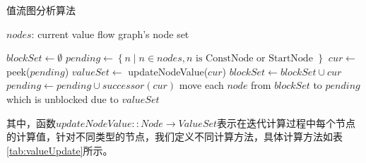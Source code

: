 \begin{algorithm}
[H]
	\caption{值流图分析算法}
	\label{alg:值流图分析算法}
	\begin{algorithmic}[1]
		
		\REQUIRE $nodes$: current value flow graph's node set
		
		\STATE $blockSet \gets \emptyset$
		\STATE $pending \gets \left\{ n \;|\; n \in nodes, n \text{ is ConstNode or StartNode }\right\}$
		\STATE $cur \gets $ peek($pending$)
		\STATE $valueSet \gets$ updateNodeValue($cur$)
		\STATE $blockSet \gets blockSet \cup cur$
		\STATE $pending \gets pending \cup successor(cur)$
		\STATE move each $node$ from $blockSet$ to $pending$ which is unblocked due to $valueSet$
		\ENDIF
		\ENDWHILE
		
	\end{algorithmic}
\end{algorithm}

其中，函数$ updateNodeValue::Node \rightarrow ValueSet $表示在迭代计算过程中每个节点的计算值，针对不同类型的节点，我们定义不同计算方法，具体计算方法如表\ref{tab:valueUpdate}所示。

